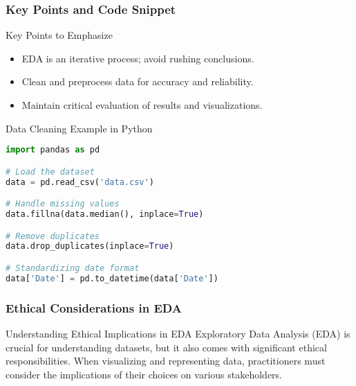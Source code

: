 \documentclass[aspectratio=169]{beamer}
\begin{document}
\begin{frame}[fragile]
    \frametitle{Key Points and Code Snippet}
    \begin{block}{Key Points to Emphasize}
        \begin{itemize}
            \item EDA is an iterative process; avoid rushing conclusions.
            \item Clean and preprocess data for accuracy and reliability.
            \item Maintain critical evaluation of results and visualizations.
        \end{itemize}
    \end{block}
    
    \begin{block}{Data Cleaning Example in Python}
        \begin{lstlisting}[language=Python]
import pandas as pd

# Load the dataset
data = pd.read_csv('data.csv')

# Handle missing values
data.fillna(data.median(), inplace=True)

# Remove duplicates
data.drop_duplicates(inplace=True)

# Standardizing date format
data['Date'] = pd.to_datetime(data['Date'])
        \end{lstlisting}
    \end{block}
\end{frame}

\begin{frame}[fragile]
    \frametitle{Ethical Considerations in EDA}
    \begin{block}{Understanding Ethical Implications in EDA}
        Exploratory Data Analysis (EDA) is crucial for understanding datasets, but it also comes with significant ethical responsibilities. When visualizing and representing data, practitioners must consider the implications of their choices on various stakeholders.
    \end{block}
\end{frame}
\end{document}
